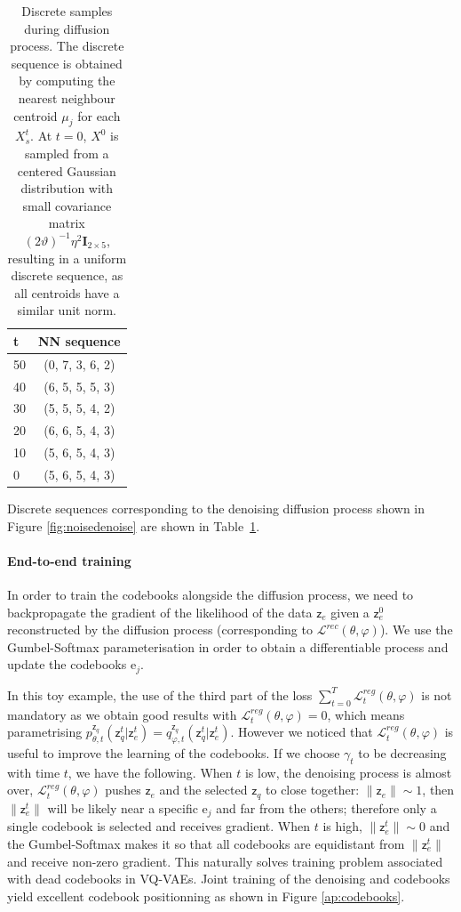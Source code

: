\documentclass[nolayout]{article}
\theoremstyle{plain}
\theoremstyle{definition}
\theoremstyle{remark}
\newcommand{\latentcont}{\mathsf{z}_e}
\newcommand{\latentdis}{\mathsf{z}_q}
\newcommand{\rme}{\mathrm{e}}
\newcommand{\embed}{\rme}
\begin{document}
\begin{table}[h!]
    
    \centering
    \begin{tabular}{l|c}
        t & NN sequence \\
        \hline
        50& (0, 7, 3, 6, 2)\\
        40& (6, 5, 5, 5, 3)\\
        30& (5, 5, 5, 4, 2)\\
        20& (6, 6, 5, 4, 3)\\
        10& (5, 6, 5, 4, 3)\\
        0& (5, 6, 5, 4, 3)
    \end{tabular}
    \caption{\label{ap:tab:discretetoy} Discrete samples during diffusion process. The discrete sequence is obtained by computing the nearest neighbour centroid $\mu_j$ for each $X^t_s$. At $t=0$, $X^0$ is sampled from a centered Gaussian distribution with small covariance matrix $(2\vartheta)^{-1}\eta^2\mathbf{I}_{2\times 5}$, resulting in a uniform discrete sequence, as all centroids have a similar unit norm.}

\end{table}


Discrete sequences corresponding to the denoising diffusion process shown in Figure \ref{fig:noisedenoise} are shown in Table~\ref{ap:tab:discretetoy}.

\paragraph{End-to-end training}
\label{ap:end2end}
In order to train the codebooks alongside the diffusion process, we need to backpropagate the gradient of the likelihood of the data $\latentcont$ given a $\latentcont^0$ reconstructed by the diffusion process (corresponding to $\mathcal{L}^{rec}(\theta,\varphi)$). We use the Gumbel-Softmax parameterisation in order to obtain a differentiable process and update the codebooks $\embed_j$.

In this toy example, the use of the third part of the loss $\sum_{t=0}^T \mathcal{L}^{reg}_t(\theta,\varphi)$ is not mandatory as we obtain good results with $\mathcal{L}^{reg}_t(\theta,\varphi) = 0$, which means parametrising $p_{\theta,t}^{\latentdis}(\latentdis^t|\latentcont^t) = q_{\varphi,t}^{\latentdis}(\latentdis^t|\latentcont^t)$. However we noticed that $\mathcal{L}^{reg}_t(\theta,\varphi)$ is useful to improve the learning of the codebooks. If we choose $\gamma_t$ to be decreasing with time $t$, we have the following. When $t$ is low, the denoising process is almost over, $\mathcal{L}^{reg}_t(\theta,\varphi)$ pushes $\latentcont$ and the selected $\latentdis$ to close together: $\|\latentcont\| \sim 1$, then $\|\latentcont^t\|$ will be likely near a specific $\embed_j$ and far from the others; therefore only a single codebook is selected and receives gradient. When $t$ is high, $\|\latentcont^t\| \sim 0$ and the Gumbel-Softmax makes it so that all codebooks are equidistant from $\|\latentcont^t\|$ and receive non-zero gradient. This naturally solves training problem associated with dead codebooks in VQ-VAEs. Joint training of the denoising and codebooks yield excellent codebook positionning as shown in Figure \ref{ap:codebooks}.
\end{document}
